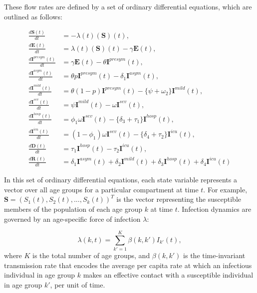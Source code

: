 \documentclass{article}
\newcommand{\foi}{\lambda}
\newcommand{\agegroup}{k}
\newcommand{\agegroups}{K}
\begin{document}
These flow rates are defined by a set of ordinary differential equations, which are outlined as follows:

\begin{align*}
\frac{d\textbf{S}(t)}{dt} & = -\lambda(t)(\textbf{S})(t), \\
%
\frac{d\textbf{E}(t)}{dt} & = \lambda(t)(\textbf{S})(t) - \gamma \textbf{E}(t), \\
%
\frac{d\textbf{I}^{presym}(t)}{dt} & = \gamma \textbf{E}(t) - \theta \textbf{I}^{presym}(t), \\
%
\frac{d\textbf{I}^{asym}(t)}{dt} & = \theta p \textbf{I}^{presym}(t) - \delta_{1} \textbf{I}^{asym}(t), \\
%
\frac{d\textbf{I}^{mild}(t)}{dt} & = \theta (1 - p) \textbf{I}^{presym}(t) - \{ \psi + \omega_{2} \} \textbf{I}^{mild}(t), \\
%
\frac{d\textbf{I}^{sev}(t)}{dt} & = \psi \textbf{I}^{mild}(t) - \omega \textbf{I}^{sev}(t), \\
%
\frac{d\textbf{I}^{hosp}(t)}{dt} & = \phi_{1} \omega \textbf{I}^{sev}(t) - \{ \delta_{3} + \tau_{1} \} \textbf{I}^{hosp}(t), \\
%
\frac{d\textbf{I}^{icu}(t)}{dt} & = (1 - \phi_1) \omega \textbf{I}^{sev}(t) - \{ \delta_{4} + \tau_{2} \} \textbf{I}^{icu}(t), \\
%
\frac{d\textbf{D}(t)}{dt} & = \tau_{1} \textbf{I}^{hosp}(t) - \tau_{2} \textbf{I}^{icu}(t), \\
%
\frac{d\textbf{R}(t)}{dt} & = \delta_{1} \textbf{I}^{asym}(t) + \delta_{2} \textbf{I}^{mild}(t) + \delta_{3} \textbf{I}^{hosp}(t) + \delta_{4} \textbf{I}^{icu}(t)
\end{align*}
%

In this set of ordinary differential equations, each state variable represents a vector over all age groups for a particular compartment at time $t$. For example, $\textbf{S} = (S_{1}(t), S_{2}(t), ..., S_{\agegroup}(t))^{T}$ is the vector representing the susceptible members of the population of each age group $\agegroup$ at time $t$. Infection dynamics are governed by an age-specific force of infection $\foi$:

\begin{equation}
    \foi(\agegroup,t) = \sum_{\agegroup'=1}^{\agegroups}\beta(\agegroup,\agegroup')I_{\agegroup'}(t),
\end{equation}
%
where $\agegroups$ is the total number of age groups, and $\beta(\agegroup,\agegroup')$ is the time-invariant transmission rate that encodes the average per capita rate at which an infectious individual in age group $\agegroup$ makes an effective contact with a susceptible individual in age group $\agegroup'$, per unit of time.
\end{document}
